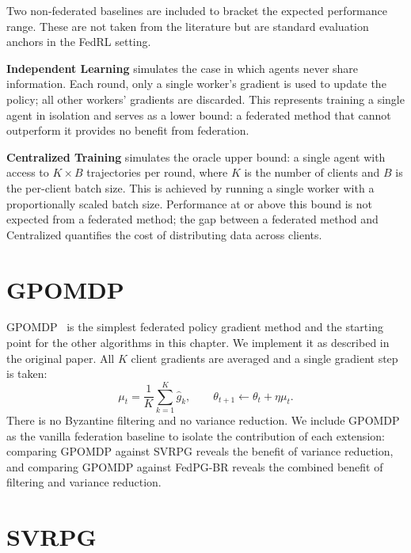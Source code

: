 \documentclass[a4paper, oneside]{discothesis}
\begin{document}
Two non-federated baselines are included to bracket the expected performance range. These are not taken from the literature but are standard evaluation anchors in the FedRL setting.

\textbf{Independent Learning} simulates the case in which agents never share information. Each round, only a single worker's gradient is used to update the policy; all other workers' gradients are discarded. This represents training a single agent in isolation and serves as a lower bound: a federated method that cannot outperform it provides no benefit from federation.

\textbf{Centralized Training} simulates the oracle upper bound: a single agent with access to $K \times B$ trajectories per round, where $K$ is the number of clients and $B$ is the per-client batch size. This is achieved by running a single worker with a proportionally scaled batch size. Performance at or above this bound is not expected from a federated method; the gap between a federated method and Centralized quantifies the cost of distributing data across clients.

\section{GPOMDP}
\label{sec:gomdp}

GPOMDP~\cite{GPOMDP} is the simplest federated policy gradient method and the starting point for the other algorithms in this chapter. We implement it as described in the original paper. All $K$ client gradients are averaged and a single gradient step is taken:
\begin{equation}
    \mu_t = \frac{1}{K} \sum_{k=1}^{K} \hat{g}_k, \qquad \theta_{t+1} \leftarrow \theta_t + \eta \mu_t.
\end{equation}
There is no Byzantine filtering and no variance reduction. We include GPOMDP as the vanilla federation baseline to isolate the contribution of each extension: comparing GPOMDP against SVRPG reveals the benefit of variance reduction, and comparing GPOMDP against FedPG-BR reveals the combined benefit of filtering and variance reduction.

\section{SVRPG}
\label{sec:svrpg}
\end{document}
